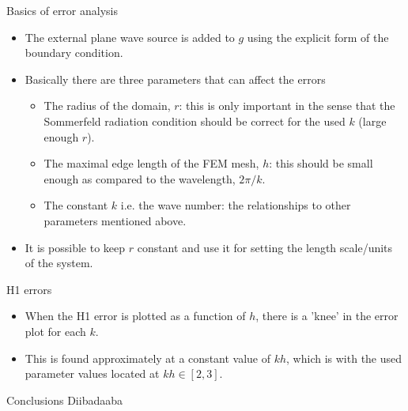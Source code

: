 \documentclass{beamer}
\begin{document}
\begin{frame}{Basics of error analysis}
 \begin{itemize}
  \item The external plane wave source is added to $g$ using the explicit form of the boundary condition.
  \item Basically there are three parameters that can affect the errors
  \begin{itemize}
  \item The radius of the domain, $r$: this is only important in the sense that the Sommerfeld radiation condition
  should be correct for the used $k$ (large enough $r$).
  \item The maximal edge length of the FEM mesh, $h$: this should be small enough as compared to the wavelength,
  $2\pi/k$.
  \item The constant $k$ i.e. the wave number: the relationships to other parameters mentioned above.
  \end{itemize}
  \item It is possible to keep $r$ constant and use it for setting the length scale/units of the system.
 \end{itemize}
\end{frame}

\begin{frame}{H1 errors}
 \begin{itemize}
  \item When the H1 error is plotted as a function of $h$, there is a 'knee' in the error plot for each $k$.
  \item This is found approximately at a constant value of $kh$, which is with the used parameter values located at $kh \in [2,3]$.
 \end{itemize}

\end{frame}

\begin{frame}{Conclusions}
 Diibadaaba
\end{frame}
\end{document}
